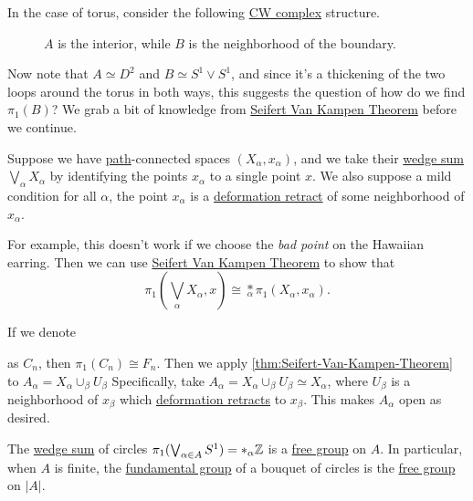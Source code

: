 \begin{explanation}
	In the case of torus, consider the following \hyperref[def:CW-Complex]{CW complex} structure.
	\begin{figure}[H]
		\centering
		\caption{\(A\) is the interior, while \(B\) is the neighborhood of the boundary.}
		\label{fig:lec11-eg2:torus}
	\end{figure}
	Now note that \(A\simeq D^{2} \) and \(B\simeq S^1\vee S^1\), and since it's a thickening of the two loops around the torus in
	both ways, this suggests the question of how do we find \(\pi _1(B)\)? We grab a bit of knowledge from \hyperref[thm:Seifert-Van-Kampen-Theorem]{Seifert Van Kampen Theorem}
	before we continue.


	\begin{exercise}
		Suppose we have \hyperref[def:path]{path}-connected spaces \((X_\alpha , x_\alpha )\), and we take their \hyperref[CW-complex-wedge-sum]{wedge sum} \(\bigvee_\alpha X_\alpha \) by
		identifying the points \(x_\alpha \) to a single point \(x\). We also suppose a mild condition for all \(\alpha\), the point
		\(x_\alpha \) is a \hyperref[def:deformation-retraction]{deformation retract} of some neighborhood of \(x_\alpha \).

		\par For example, this doesn't work if we choose the \emph{bad point} on the Hawaiian earring. Then we can use \hyperref[thm:Seifert-Van-Kampen-Theorem]{Seifert Van Kampen Theorem}
		to show that
		\[
			\pi _1\left(\bigvee_\alpha X_\alpha , x\right) \cong \underset{\alpha }{\ast}\pi _1\left(X_\alpha , x_\alpha \right).
		\]
	\end{exercise}
	\begin{answer}
		If we denote
		\begin{figure}[H]
			\centering
			\label{fig:eg-2:Seifert-Van-Kampen-Theorem}
		\end{figure}
		as \(C_n\), then \(\pi _1(C_n)\cong F_n\). Then we apply \autoref{thm:Seifert-Van-Kampen-Theorem} to \(A_\alpha = X_\alpha \cup_{\beta }U_\beta \)
		Specifically, take \(A_\alpha = X_\alpha \cup_\beta U_\beta \simeq X_\alpha \), where \(U_\beta \) is a neighborhood of \(x_\beta \) which
		\hyperref[def:deformation-retraction]{deformation retracts} to \(x_\beta \). This makes \(A_\alpha \) open as desired.
	\end{answer}

	\begin{corollary}
		The \hyperref[CW-complex-wedge-sum]{wedge sum} of circles \(\pi _1(\bigvee_{\alpha \in A}S^1) = \ast_\alpha \mathbb{\MakeUppercase{z}} \) is a \hyperref[def:free-group]{free group} on \(A\).
		In particular, when \(A\) is finite, the \hyperref[def:fundamental-group]{fundamental group} of a bouquet of circles is the \hyperref[def:free-group]{free group}
		on \(\left\vert A \right\vert \).
	\end{corollary}


\end{explanation}

